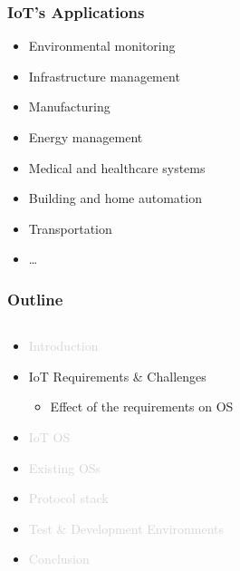 \documentclass{beamer}
\begin{document}
\begin{frame}
	\frametitle{IoT's Applications}
	\begin{itemize}
		\item Environmental monitoring
		\item Infrastructure management
		\item Manufacturing
		\item Energy management
		\item Medical and healthcare systems
		\item Building and home automation
		\item Transportation
		\item \ldots
	\end{itemize}
\end{frame}
\begin{frame}
	\frametitle{Outline}
	\begin{columns}[c]
		\begin{column}{30cm}
			\vspace{.1cm}
			\begin{itemize}
				\justifying
				\item \textcolor{LightGray}{Introduction}
				\item IoT Requirements \& Challenges
				\begin{itemize}
					\item Effect of the requirements on OS
				\end{itemize}				
				\item \textcolor{LightGray}{IoT OS}
				\item \textcolor{LightGray}{Existing OSs}
				\item \textcolor{LightGray}{Protocol stack}
				\item \textcolor{LightGray}{Test \& Development Environments}
				\item \textcolor{LightGray}{Conclusion}
			\end{itemize}
		\end{column}
	\end{columns}
\end{frame}
\end{document}
